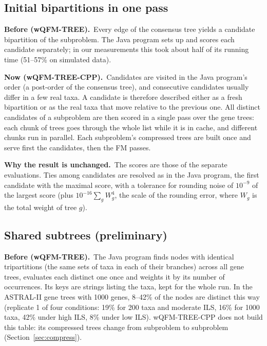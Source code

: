 \documentclass[11pt,a4paper]{article}
\newcommand{\wqfmtree}{wQFM-TREE}
\newcommand{\cpp}{wQFM-TREE-CPP}
\newcommand{\Before}{\par\smallskip\noindent\textbf{\textcolor{beforec}{Before (\wqfmtree).}}\ }
\newcommand{\Now}{\par\smallskip\noindent\textbf{\textcolor{nowc}{Now (\cpp).}}\ }
\newcommand{\Exact}{\par\smallskip\noindent\textbf{Why the result is unchanged.}\ }
\begin{document}
\subsection{Initial bipartitions in one pass}\label{sec:initial}

\Before Every edge of the consensus tree yields a candidate bipartition of the subproblem. The Java
program sets up and scores each candidate separately; in our measurements this took about half of
its running time (51--57\% on simulated data).

\Now Candidates are visited in the Java program's order (a post-order of the consensus tree), and
consecutive candidates usually differ in a few real taxa. A candidate is therefore described either
as a fresh bipartition or as the real taxa that move relative to the previous one. All distinct
candidates of a subproblem are then scored in a single pass over the gene trees: each chunk of
trees goes through the whole list while it is in cache, and different chunks run in parallel. Each
subproblem's compressed trees are built once and serve first the candidates, then the FM passes.

\Exact The scores are those of the separate evaluations. Ties among candidates are resolved as in
the Java program, the first candidate with the maximal score, with a tolerance for rounding noise
of $10^{-9}$ of the largest score (plus $10^{-16}\sum_g W_g^4$, the scale of the rounding error,
where $W_g$ is the total weight of tree $g$).

\subsection{Shared subtrees (preliminary)}\label{sec:shared}

\Before The Java program finds nodes with identical tripartitions (the same sets of taxa in each of
their branches) across all gene trees, evaluates each distinct one once and weights it by its
number of occurrences. Its keys are strings listing the taxa, kept for the whole run. In the
ASTRAL-II gene trees with 1000 genes, 8--42\% of the nodes are distinct this way (replicate 1 of four
conditions: 19\% for 200 taxa and moderate ILS, 16\% for 1000 taxa, 42\% under high ILS, 8\% under
low ILS). \cpp{} does not build this table: its compressed trees change from subproblem to subproblem
(Section~\ref{sec:compress}).
\end{document}
